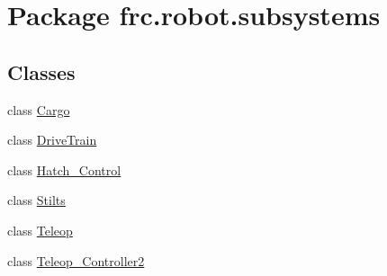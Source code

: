 \hypertarget{namespacefrc_1_1robot_1_1subsystems}{}\section{Package frc.\+robot.\+subsystems}
\label{namespacefrc_1_1robot_1_1subsystems}
\subsection*{Classes}
\begin{DoxyCompactItemize}
\item 
class \hyperlink{classfrc_1_1robot_1_1subsystems_1_1Cargo}{Cargo}
\item 
class \hyperlink{classfrc_1_1robot_1_1subsystems_1_1DriveTrain}{Drive\+Train}
\item 
class \hyperlink{classfrc_1_1robot_1_1subsystems_1_1Hatch__Control}{Hatch\+\_\+\+Control}
\item 
class \hyperlink{classfrc_1_1robot_1_1subsystems_1_1Stilts}{Stilts}
\item 
class \hyperlink{classfrc_1_1robot_1_1subsystems_1_1Teleop}{Teleop}
\item 
class \hyperlink{classfrc_1_1robot_1_1subsystems_1_1Teleop__Controller2}{Teleop\+\_\+\+Controller2}
\end{DoxyCompactItemize}
